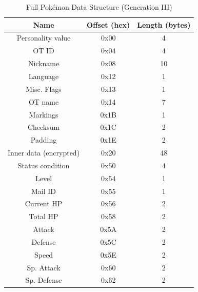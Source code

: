 \documentclass[a4paper]{usiinfbachelorproject}
\begin{document}
\begin{table}[h!]
	\centering
	\begin{tabular}{|c|c|c|}
		\hline
		\textbf{Name}          & \textbf{Offset (hex)} & \textbf{Length (bytes)} \\
		\hline
		Personality value      & 0x00                  & 4                       \\
		OT ID                  & 0x04                  & 4                       \\
		Nickname               & 0x08                  & 10                      \\
		Language               & 0x12                  & 1                       \\
		Misc. Flags            & 0x13                  & 1                       \\
		OT name                & 0x14                  & 7                       \\
		Markings               & 0x1B                  & 1                       \\
		Checksum               & 0x1C                  & 2                       \\
		Padding                & 0x1E                  & 2                       \\
		Inner data (encrypted) & 0x20                  & 48                      \\
		Status condition       & 0x50                  & 4                       \\
		Level                  & 0x54                  & 1                       \\
		Mail ID                & 0x55                  & 1                       \\
		Current HP             & 0x56                  & 2                       \\
		Total HP               & 0x58                  & 2                       \\
		Attack                 & 0x5A                  & 2                       \\
		Defense                & 0x5C                  & 2                       \\
		Speed                  & 0x5E                  & 2                       \\
		Sp. Attack             & 0x60                  & 2                       \\
		Sp. Defense            & 0x62                  & 2                       \\
		\hline
	\end{tabular}
	\caption{Full Pokémon Data Structure (Generation III)}
	\label{fig:full-pokemon-structure}
\end{table}
\end{document}
